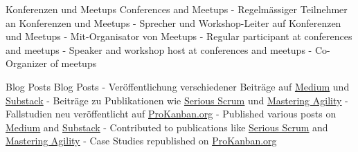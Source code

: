 {
}

\begin{cvskills}
	\cvskill
	{
			{ Konferenzen und Meetups }
			{ Conferences and Meetups }
	} %
	{
		{
			- Regelmässiger Teilnehmer an Konferenzen und Meetups \linebreak
			- Sprecher und Workshop-Leiter auf Konferenzen und Meetups \linebreak
			- Mit-Organisator von Meetups \linebreak
		}
		{
			- Regular participant at conferences and meetups \linebreak
			- Speaker and workshop host at conferences and meetups \linebreak
			- Co-Organizer of meetups \linebreak
		}
	}
	
	\cvskill
	{
			{ Blog Posts }
			{ Blog Posts }
	} %
	{
		{
			- Veröffentlichung verschiedener Beiträge auf \underline{\href{https://medium.com/@benjihuser}{Medium}} und \underline{\href{https://substack.com/@huserben}{Substack}} \linebreak
			- Beiträge zu Publikationen wie \underline{\href{https://medium.com/serious-scrum}{Serious Scrum}} und \underline{\href{https://medium.com/mastering-agility}{Mastering Agility}} \linebreak
			- Fallstudien neu veröffentlicht auf \underline{\href{https://www.prokanban.org/blog/https-prokanban-org-blog-monte-carlo-simulations-accuracy-and-unplanned-work-a-case-study}{ProKanban.org}}
		}
		{
			- Published various posts on \underline{\href{https://medium.com/@benjihuser}{Medium}} and \underline{\href{https://substack.com/@huserben}{Substack}} \linebreak
			- Contributed to publications like \underline{\href{https://medium.com/serious-scrum}{Serious Scrum}} and \underline{\href{https://medium.com/mastering-agility}{Mastering Agility}} \linebreak
			- Case Studies republished on \underline{\href{https://www.prokanban.org/blog/https-prokanban-org-blog-monte-carlo-simulations-accuracy-and-unplanned-work-a-case-study}{ProKanban.org}} 
		}
	}
	

\end{cvskills}
